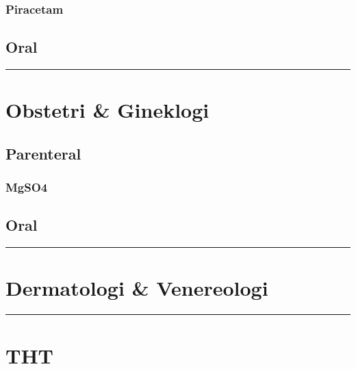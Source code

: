 \documentclass[
]{book}
\begin{document}
\hypertarget{piracetam}{%
\subsubsection{Piracetam}\label{piracetam}}

\hypertarget{oral-2}{%
\subsection{Oral}\label{oral-2}}

\begin{center}\rule{0.5\linewidth}{0.5pt}\end{center}

\hypertarget{obstetri-gineklogi-2}{%
\section{Obstetri \& Gineklogi}\label{obstetri-gineklogi-2}}

\hypertarget{parenteral-4}{%
\subsection{Parenteral}\label{parenteral-4}}

\hypertarget{mgso4}{%
\subsubsection{MgSO4}\label{mgso4}}

\hypertarget{oral-3}{%
\subsection{Oral}\label{oral-3}}

\begin{center}\rule{0.5\linewidth}{0.5pt}\end{center}

\hypertarget{dermatologi-venereologi-1}{%
\section{Dermatologi \& Venereologi}\label{dermatologi-venereologi-1}}

\begin{center}\rule{0.5\linewidth}{0.5pt}\end{center}

\hypertarget{tht-1}{%
\section{THT}\label{tht-1}}
\end{document}
